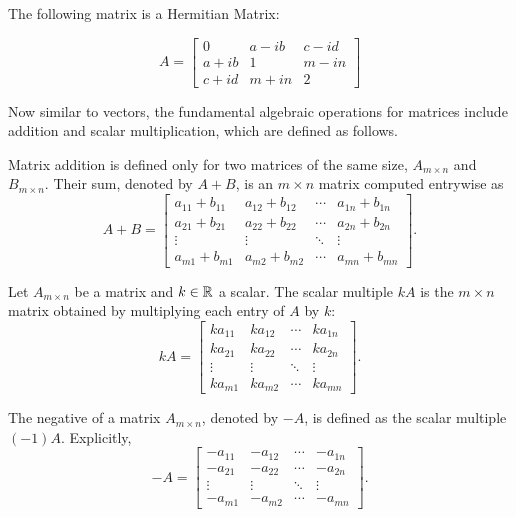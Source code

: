 \documentclass[12pt]{article}
\begin{document}
\begin{example}
    The following matrix is a Hermitian Matrix:

    $$
    A = 
    \begin{bmatrix}
    0 & a - ib & c - id \\
    a + ib & 1 & m - in \\
    c + id & m + in & 2
    \end{bmatrix}
    $$
\end{example}

Now similar to vectors, the fundamental algebraic operations for matrices include addition and scalar multiplication, which are defined as follows. 


\begin{definition}
    Matrix addition is defined only for two matrices of the same size, $A_{m \times n}$ and $B_{m \times n}$. Their sum, denoted by $A + B$, is an $m \times n$ matrix computed entrywise as
    \[
    A + B =
    \begin{bmatrix}
    a_{11} + b_{11} & a_{12} + b_{12} & \cdots & a_{1n} + b_{1n} \\
    a_{21} + b_{21} & a_{22} + b_{22} & \cdots & a_{2n} + b_{2n} \\
    \vdots & \vdots & \ddots & \vdots \\
    a_{m1} + b_{m1} & a_{m2} + b_{m2} & \cdots & a_{mn} + b_{mn}
    \end{bmatrix}.
    \]
\end{definition}

\begin{definition}
    Let $A_{m \times n}$ be a matrix and $k \in \mathbb{R}$ a scalar. The scalar multiple $kA$ is the $m \times n$ matrix obtained by multiplying each entry of $A$ by $k$:
    \[
    kA =
    \begin{bmatrix}
    k a_{11} & k a_{12} & \cdots & k a_{1n} \\
    k a_{21} & k a_{22} & \cdots & k a_{2n} \\
    \vdots   & \vdots   & \ddots & \vdots   \\
    k a_{m1} & k a_{m2} & \cdots & k a_{mn}
    \end{bmatrix}.
    \]
\end{definition}

\begin{definition}
    The negative of a matrix $A_{m \times n}$, denoted by $-A$, is defined as the scalar multiple $(-1)A$. Explicitly,
    \[
    -A =
    \begin{bmatrix}
    -a_{11} & -a_{12} & \cdots & -a_{1n} \\
    -a_{21} & -a_{22} & \cdots & -a_{2n} \\
    \vdots  & \vdots  & \ddots & \vdots  \\
    -a_{m1} & -a_{m2} & \cdots & -a_{mn}
    \end{bmatrix}.
    \]
\end{definition}
\end{document}
